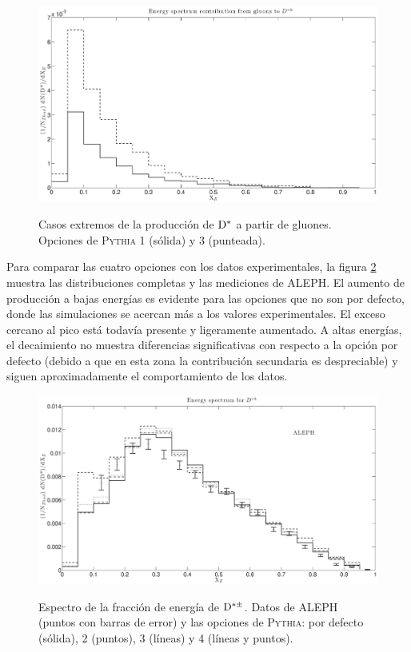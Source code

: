 \begin{figure}[h]
\centering
\caption[Contribución de los gluones a la producción de $\D^{*\pm}$ en dos casos extremos.]{Casos extremos de la producción de ${\mathrm D}^{*}$ a partir de gluones. Opciones de \textsc{Pythia} 1 (sólida) y 3 (punteada).}
\includegraphics[width=15cm]{GluonDStarThesis}
\label{fig:GluonDStar}
\end{figure}

Para comparar las cuatro opciones con los datos experimentales, la figura \ref{fig:DStarOp} muestra las distribuciones completas y las mediciones de ALEPH. El aumento de producción a bajas energías es evidente para las opciones que no son por defecto, donde las simulaciones se acercan más a los valores experimentales. El exceso cercano al pico está todavía presente y ligeramente aumentado. A altas energías, el decaimiento no muestra diferencias significativas con respecto a la opción por defecto (debido a que en esta zona la contribución secundaria es despreciable) y siguen aproximadamente el comportamiento de los datos.

\begin{figure}[!h]
\centering
\caption[Espectro de la fracción de energía de $\D^{*\pm}$. Simulación y datos comparados.]{Espectro de la fracción de energía de $\D^{*\pm}$. Datos de ALEPH (puntos con barras de error) y las opciones de \textsc{Pythia}: por defecto (sólida), 2 (puntos), 3 (líneas) y 4 (líneas y puntos).}
\includegraphics[width=15cm]{DStarOpThesis}
\label{fig:DStarOp}
\end{figure}

